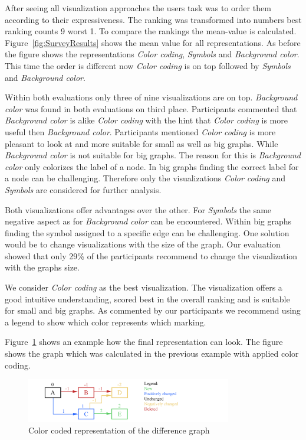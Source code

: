 \documentclass{llncs}
\begin{document}
After seeing all visualization approaches the users task was to order them according to their expressiveness. The ranking was transformed into numbers best ranking counts 9 worst 1. To compare the rankings the mean-value is calculated. Figure~\ref{fig:SurveyResults} shows the mean value for all representations. As before the figure shows the representations \emph{Color coding}, \emph{Symbols} and \emph{Background color}. This time the order is different now \emph{Color coding} is on top followed by \emph{Symbols} and \emph{Background color}.


Within both evaluations only three of nine visualizations are on top. \emph{Background color} was found in both evaluations on third place. Participants commented that \emph{Background color} is alike \emph{Color coding} with the hint that \emph{Color coding} is more useful then \emph{Background color}. Participants mentioned \emph{Color coding} is more pleasant to look at and more suitable for small as well as big graphs. While \emph{Background color} is not suitable for big graphs. The reason for this is \emph{Background color} only colorizes the label of a node. In big graphs finding the correct label for a node can be challenging. Therefore only the visualizations \emph{Color coding} and \emph{Symbols} are considered for further analysis.

Both visualizations offer advantages over the other. For \emph{Symbols} the same negative aspect as for \emph{Background color} can be encountered. Within big graphs finding the symbol assigned to a specific edge can be challenging. One solution would be to change visualizations with the size of the graph. Our evaluation showed that only 29\% of the participants recommend to change the visualization with the graphs size.

We consider \emph{Color coding} as the best visualization. The visualization offers a good intuitive understanding, scored best in the overall ranking and is suitable for small and big graphs. As commented by our participants we recommend using a legend to show which color represents which marking.

Figure~\ref{fig:DiffGraphVisualization} shows an example how the final representation can look. The figure shows the graph which was calculated in the previous example with applied color coding.

\begin{figure}
	\centering
	\includegraphics[width=0.8\textwidth]{Images/ColorCodedGraph.PNG}
	\caption{Color coded representation of the difference graph}
	\label{fig:DiffGraphVisualization}
\end{figure}
\end{document}
